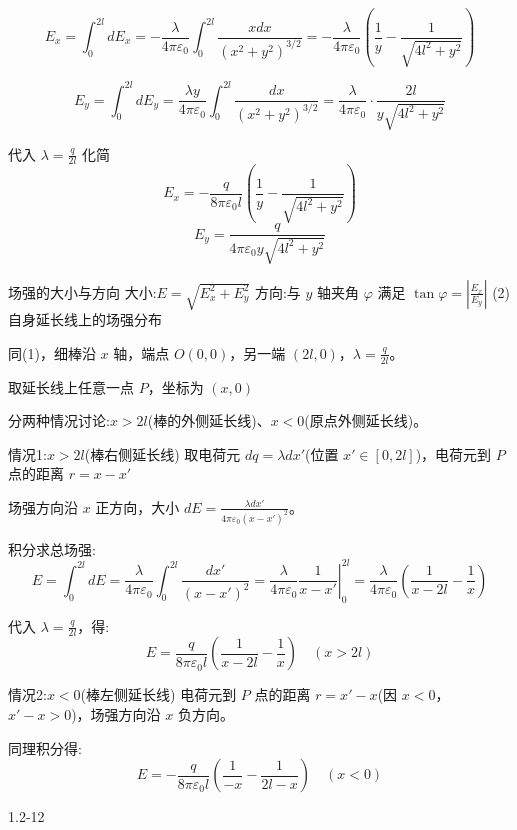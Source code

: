 \documentclass{article}
\begin{document}
$$E_x = \int_0^{2l} dE_x = -\frac{\lambda}{4\pi\varepsilon_0} \int_0^{2l} \frac{x dx}{(x^2+y^2)^{3/2}} = -\frac{\lambda}{4\pi\varepsilon_0} \left( \frac{1}{y} - \frac{1}{\sqrt{4l^2+y^2}} \right)$$

$$E_y = \int_0^{2l} dE_y =\frac{\lambda y}{4\pi\varepsilon_0} \int_0^{2l} \frac{dx}{(x^2+y^2)^{3/2}} = \frac{\lambda}{4\pi\varepsilon_0} \cdot \frac{2l}{y\sqrt{4l^2+y^2}}$$

代入 $ \lambda = \frac{q}{2l} $ 化简
$$E_x = -\frac{q}{8\pi\varepsilon_0 l} \left( \frac{1}{y} - \frac{1}{\sqrt{4l^2+y^2}} \right) $$
$$E_y = \frac{q}{4\pi\varepsilon_0 y \sqrt{4l^2+y^2}}$$

 场强的大小与方向
大小:$ E = \sqrt{E_x^2 + E_y^2} $
方向:与 $ y $ 轴夹角 $ \varphi $ 满足 $ \tan\varphi = \left| \frac{E_x}{E_y} \right| $
\newpage
 (2)  自身延长线上的场强分布

同(1)，细棒沿 $ x $ 轴，端点 $ O(0,0) $，另一端 $ (2l,0) $，$ \lambda = \frac{q}{2l} $。

取延长线上任意一点 $ P $，坐标为 $ (x, 0) $

分两种情况讨论:$x>2l $(棒的外侧延长线)、$x<0 $(原点外侧延长线)。

 情况1:$ x>2l $(棒右侧延长线)
取电荷元 $ dq = \lambda dx' $(位置 $ x' \in [0,2l] $)，电荷元到 $ P $ 点的距离 $ r = x - x' $

场强方向沿 $ x $ 正方向，大小 $ dE = \frac{\lambda dx'}{4\pi\varepsilon_0(x - x')^2} $。

积分求总场强:
$$E = \int_0^{2l} dE = \frac{\lambda}{4\pi\varepsilon_0} \int_0^{2l} \frac{dx'}{(x - x')^2} = \frac{\lambda}{4\pi\varepsilon_0} \left. \frac{1}{x - x'} \right|_0^{2l} = \frac{\lambda}{4\pi\varepsilon_0} \left( \frac{1}{x - 2l} - \frac{1}{x} \right)$$

代入 $ \lambda = \frac{q}{2l} $，得:
$$E = \frac{q}{8\pi\varepsilon_0 l} \left( \frac{1}{x - 2l} - \frac{1}{x} \right) \quad (x>2l)$$

 情况2:$ x<0 $(棒左侧延长线)
电荷元到 $ P $ 点的距离 $ r = x' - x $(因 $ x<0 $，$ x' - x > 0 $)，场强方向沿 $ x $ 负方向。

同理积分得:
$$E = -\frac{q}{8\pi\varepsilon_0 l} \left( \frac{1}{-x} - \frac{1}{2l - x} \right) \quad (x<0)$$






\newpage

1.2-12

\end{document}
